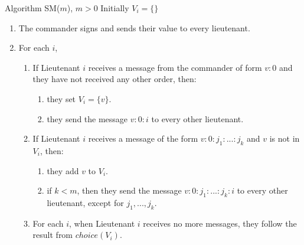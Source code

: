 \documentclass{beamer}
\theoremstyle{conjecture1}
\theoremstyle{conjecture2}
\begin{document}
\begin{frame}
    \begin{block}{Algorithm SM($m$), $m>0$}
        Initially $V_i=\{\}$
        \begin{enumerate}[label=\arabic{enumi}.]
            \item<1-> The commander signs and sends their value to every lieutenant.
            \item<2-> For each $i$,
            \begin{enumerate}[label={\alph*.}]
                \item<3-> {
                    If Lieutenant $i$ receives a message from the commander of form $v:0$ and they have not received
                    any other order, then:
                    \begin{enumerate}[label=\roman*.]
                        \item<4-> they set $V_i=\{v\}$.
                        \item<5-> they send the message $v:0:i$ to every other lieutenant.
                    \end{enumerate}
                }
                \item<6-> {
                    If Lieutenant $i$ receives a message of the form $v:0:j_1:...:j_k$ and $v$ is not in $V_i$, 
                    then:
                    \begin{enumerate}[label=\roman*.]
                        \item<7-> they add $v$ to $V_i$.
                        \item<8-> {
                            if $k < m$, then they send the message $v:0:j_1:...:j_k:i$ to every other lieutenant,
                            except for $j_1,...,j_k$.
                        }
                    \end{enumerate}
                }
                \item<9-> {
                    For each $i$, when Lieutenant $i$ receives no more messages, they follow the result from 
                    $choice(V_i)$.
                }
            \end{enumerate}
            
        \end{enumerate}
    \end{block}
\end{frame}
\end{document}
